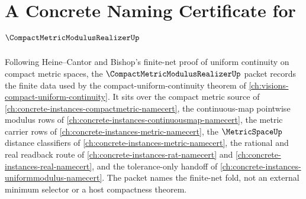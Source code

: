 \chapter{A Concrete Naming Certificate for $\CompactMetricModulusRealizerUp$}
\label{ch:concrete-instances-compact-metric-modulus-realizer-namecert}

Following Heine--Cantor and Bishop's finite-net proof of uniform continuity on compact metric spaces, the $\CompactMetricModulusRealizerUp$ packet records the finite data used by the compact-uniform-continuity theorem of \autoref{ch:visions-compact-uniform-continuity}. It sits over the compact metric source of \autoref{ch:concrete-instances-compactmetric-namecert}, the continuous-map pointwise modulus rows of \autoref{ch:concrete-instances-continuousmap-namecert}, the metric carrier rows of \autoref{ch:concrete-instances-metric-namecert}, the $\MetricSpaceUp$ distance classifiers of \autoref{ch:concrete-instances-metric-namecert}, the rational and real readback route of \autoref{ch:concrete-instances-rat-namecert} and \autoref{ch:concrete-instances-real-namecert}, and the tolerance-only handoff of \autoref{ch:concrete-instances-uniformmodulus-namecert}. The packet names the finite-net fold, not an external minimum selector or a host compactness theorem.

